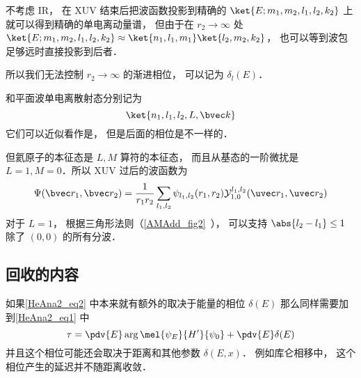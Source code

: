 不考虑 IR， 在 XUV 结束后把波函数投影到精确的 $\ket{E; m_1,m_2,l_1,l_2,k_2}$ 上就可以得到精确的单电离动量谱， 但由于在 $r_2\to\infty$ 处 $\ket{E; m_1,m_2,l_1,l_2,k_2}\approx \ket{n_1,l_1,m_1}\ket{l_2,m_2,k_2}$， 也可以等到波包足够远时直接投影到后者．

所以我们无法控制 $r_2\to \infty$  的渐进相位， 可以记为 $\delta_l(E)$．





和平面波单电离散射态分别记为
\begin{equation}
\ket{n_1,l_1,l_2,L,\bvec k}
\end{equation}
它们可以近似看作是， 但是后面的相位是不一样的．

但氦原子的本征态是 $L,M$ 算符的本征态， 而且从基态的一阶微扰是 $L = 1, M = 0$．所以 XUV 过后的波函数为
\begin{equation}
\Psi(\bvec r_1, \bvec r_2) = \frac{1}{r_1 r_2}\sum_{l_1,l_2} \psi_{l_1,l_2}(r_1, r_2)\mathcal Y_{1,0}^{l_1,l_2}(\uvec r_1, \uvec r_2)
\end{equation}
对于 $L = 1$， 根据三角形法则（\autoref{AMAdd_fig2}~）， 可以支持 $\abs{l_2 - l_1} \le 1$ 除了 $(0,0)$ 的所有分波． 


\subsection{回收的内容}

如果\autoref{HeAna2_eq2} 中本来就有额外的取决于能量的相位 $\delta(E)$ 那么同样需要加到\autoref{HeAna2_eq1} 中
\begin{equation}
\tau = \pdv{E} \arg \mel{\psi_E}{H'}{\psi_0} + \pdv{E} \delta(E)
\end{equation}
并且这个相位可能还会取决于距离和其他参数 $\delta(E, x)$． 例如库仑相移中， 这个相位产生的延迟并不随距离收敛．

